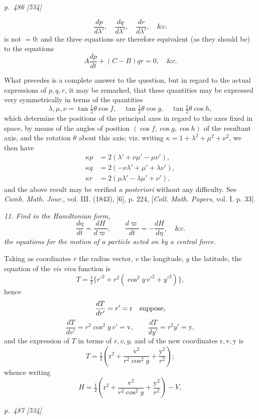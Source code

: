 \documentclass[11pt,a4paper]{article}
\theoremstyle{plain}
\theoremstyle{definition}
\newcommand{\sect}[1]{\medskip\noindent\textit{#1}}
\newcommand{\half}{\tfrac12}
\begin{document}
\bigskip
\textit{p.~486 [534]}
\smallskip

\noindent
\[
        \frac{dp}{d\lambda'},\quad \frac{dq}{d\lambda'},\quad
        \frac{dr}{d\lambda'},\quad \&c.
\]
is not $=0$; and the three equations are therefore equivalent (as they should be) to
the equations
\[
        A\frac{dp}{dt}+(C-B)qr=0,\quad \&c.
\]

What precedes is a complete answer to the question, but in regard to the actual
expressions of $p,q,r$, it may be remarked, that these quantities may be expressed
very symmetrically in terms of the quantities
\[
        \lambda,\mu,\nu=\tan\tfrac12\theta\cos f,\quad
        \tan\tfrac12\theta\cos g,\quad
        \tan\tfrac12\theta\cos h,
\]
which determine the positions of the principal axes in regard to the axes fixed in
space, by means of the angles of position $(\cos f,\cos g,\cos h)$ of the resultant
axis, and the rotation $\theta$ about this axis; viz. writing
$\kappa=1+\lambda^2+\mu^2+\nu^2$, we then have
\[
\begin{split}
\kappa p&=2(\lambda'+\nu\mu'-\mu\nu'),\\
\kappa q&=2(-\nu\lambda'+\mu'+\lambda\nu'),\\
\kappa r&=2(\mu\lambda'-\lambda\mu'+\nu'),
\end{split}
\]
and the above result may be verified \textit{a posteriori} without any difficulty.
See \textit{Camb. Math. Jour.}, vol. III. (1843), [6], p. 224,
[\textit{Coll. Math. Papers}, vol. I. p. 33].

\sect{11. Find in the Hamiltonian form,}
\[
        \frac{d\eta}{dt}=\frac{dH}{d\varpi},\qquad
        \frac{d\varpi}{dt}=-\frac{dH}{d\eta},\quad \&c.
\]
\sect{the equations for the motion of a particle acted on by a central force.}

Taking as coordinates $r$ the radius vector, $v$ the longitude, $y$ the latitude,
the equation of the \textit{vis viva} function is
\[
        T=\half\{r'^2+r^2(\cos^2 y\,v'^2+y'^2)\},
\]
hence
\[
\frac{dT}{dr'}=r'=\mathrm r\quad\hbox{suppose,}
\]
\[
\frac{dT}{dv'}=r^2\cos^2y\,v'=\mathrm v,\qquad
\frac{dT}{dy'}=r^2y'=\mathrm y,
\]
and the expression of $T$ in terms of $r,v,y$, and of the new coordinates
$\mathrm r,\mathrm v,\mathrm y$ is
\[
        T=\half\left(\mathrm r^2+\frac{\mathrm v^2}{r^2\cos^2 y}
        +\frac{\mathrm y^2}{r^2}\right);
\]
whence writing
\[
        H=\half\left(\mathrm r^2+\frac{\mathrm v^2}{r^2\cos^2 y}
        +\frac{\mathrm y^2}{r^2}\right)-V,
\]
\clearpage

\bigskip
\textit{p.~487 [534]}
\smallskip
\end{document}

